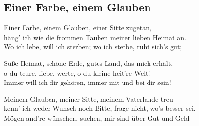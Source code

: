 
\subsection*{Einer Farbe, einem Glauben}
%
%
%
\nopagebreak
{}
%
\nopagebreak
\thestrophe Einer Farbe, einem Glauben, einer Sitte zugetan, \\
häng' ich wie die frommen Tauben meiner lieben Heimat an. \\
Wo ich lebe, will ich sterben; wo ich sterbe, ruht sich's gut; \\

\thestrophe Süße Heimat, schöne Erde, gutes Land, das mich erhält, \\
o du teure, liebe, werte, o du kleine heit're Welt! \\
Immer will ich dir gehören, immer mit und bei dir sein! \\

\thestrophe Meinem Glauben, meiner Sitte, meinem Vaterlande treu, \\
kenn' ich weder Wunsch noch Bitte, frage nicht, wo's besser sei. \\
Mögen and're wünschen, suchen, mir sind über Gut und Geld \\
